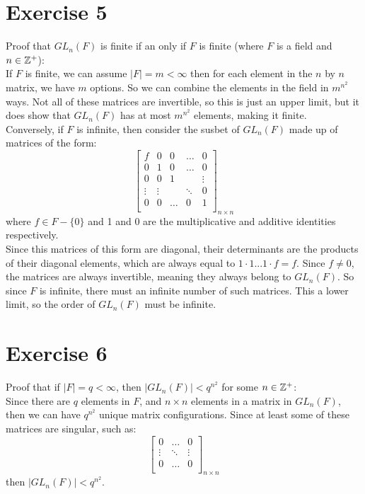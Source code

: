 \documentclass[12pt]{article}
\begin{document}
    \section*{Exercise 5}
    Proof that $GL_n(F)$ is finite if an only if $F$ is finite
    (where $F$ is a field and $n \in \mathbb{Z}^+$): \\
    If $F$ is finite, we can assume $|F| = m < \infty$
    then for each element in the $n$ by $n$ matrix, we have $m$ options.
    So we can combine the elements in the field in $m^{n^2}$ ways.
    Not all of these matrices are invertible,
    so this is just an upper limit,
    but it does show that $GL_n(F)$ has at most $m^{n^2}$ elements,
    making it finite. \\
    Conversely, if $F$ is infinite,
    then consider the susbet of $GL_n(F)$ made up of matrices of the form:
    \[\begin{bmatrix}
    f & 0 & 0 & \dots & 0\\
    0 & 1 & 0 & \dots & 0 \\
    0 & 0 & 1 & & \vdots \\
    \vdots & \vdots & & \ddots & 0\\ 
    0 & 0 & \dots & 0 & 1 \\
    \end{bmatrix}_{n \times n}\]
    where $f \in F - \{0\}$ and 1 and 0 are the multiplicative and
    additive identities respectively. \\
    Since this matrices of this form are diagonal,
    their determinants are the products of their diagonal elements,
    which are always equal to $1 \cdot 1 ... 1 \cdot f = f$.
    Since $f \neq 0$, the matrices are always invertible, meaning
    they always belong to $GL_n(F)$.
    So since $F$ is infinite, there must an infinite number of
    such matrices.
    This a lower limit, so the order of $GL_n(F)$ must be infinite.


    \section*{Exercise 6}
    Proof that if $|F| = q < \infty$,
    then $|GL_n(F)| < q^{n^2}$ for some $n \in \mathbb{Z}^+$: \\
    Since there are $q$ elements in $F$,
    and $n \times n$ elements in a matrix in $GL_n(F)$, 
    then we can have $q^{n^2}$ unique matrix configurations.
    Since at least some of these matrices are singular, such as:
    \[\begin{bmatrix}
    0 & \dots & 0\\
    \vdots & \ddots & \vdots \\ 
    0 & \dots & 0 \\
    \end{bmatrix}_{n \times n}\]
    then $|GL_n(F)| < q^{n^2}$.
\end{document}
